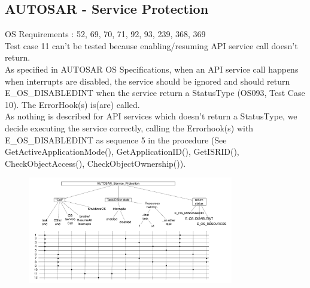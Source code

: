 \documentclass[10pt]{article}
\begin{document}
	\subsection{AUTOSAR - Service Protection}
	OS Requirements : 52, 69, 70, 71, 92, 93, 239, 368, 369\\
	Test case 11 can't be tested because enabling/resuming API service call doesn't return.\\	
	As specified in AUTOSAR OS Specifications, when an API service call happens when interrupts are disabled, the service should be ignored and should return E\_OS\_DISABLEDINT when the service return a StatusType (OS093, Test Case 10). The ErrorHook(s) is(are) called.\\
	As nothing is described for API services which doesn't return a StatusType, we decide executing the service correctly, calling the Errorhook(s) with E\_OS\_DISABLEDINT as sequence 5 in the procedure (See GetActiveApplicationMode(), GetApplicationID(), GetISRID(), CheckObjectAccess(), CheckObjectOwnership()). \\
	
	\begin{figure}[htbp] %
  		\centering
		\includegraphics[width=0.8\textwidth]{graphics/AUTOSAR_Service_Protection.pdf}
	\end{figure}
\end{document}
